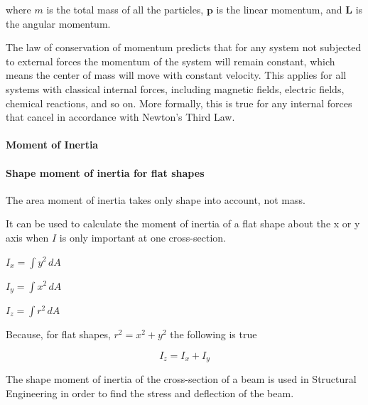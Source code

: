 where $m$ is the total mass of all the particles, $\mathbf{p}$ is the linear momentum, and $\mathbf{L}$ is the angular momentum.



The law of conservation of momentum predicts that for any system not subjected to external forces the momentum of the system will remain constant, which means the center of mass will move with constant velocity. This applies for all systems with classical internal forces, including magnetic fields, electric fields, chemical reactions, and so on. More formally, this is true for any internal forces that cancel in accordance with Newton's Third Law.



\paragraph{Moment of Inertia}



\paragraph{Shape moment of inertia for flat shapes}



The area moment of inertia takes only shape into account, not mass.



It can be used to calculate the moment of inertia of a flat shape about the x or y axis when $I$ is only important at one cross-section.





$I _x=\int y^2\,dA$





$I _y=\int x^2\,dA$





$I _z =\int r^2\,dA$





Because, for flat shapes, $r^2=x^2 + y^2$ the following is true

$$I _z = I _x + I _y$$



The shape moment of inertia of the cross-section of a beam is used in Structural Engineering in order to find the stress and deflection of the beam.



